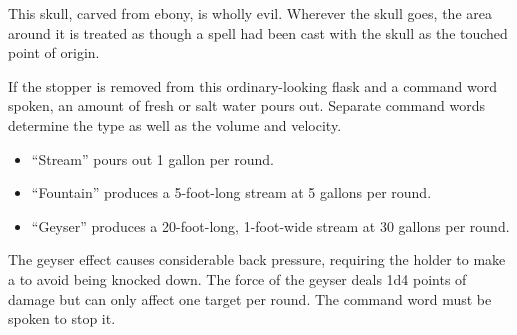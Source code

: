{

\begin{comment}
Cubic Gate:} This item is fashioned from carnelian. Each of the six sides of the cube is keyed to a plane, one of which is the Material Plane. The character creating the item should choose the planes to which the other five sides are keyed.

If a side of the cubic gate is pressed once, it opens a gate to a random point on the plane keyed to that side. There is a 10\% chance per minute that an outsider from that plane (determine randomly) comes through it looking for food, fun, or trouble. Pressing the side a second time closes the gate. It is impossible to open more than one gate at a time.

If a side is pressed twice in quick succession, the character so doing is transported to a random point on the other plane, along with all creatures in adjacent squares. (The other creatures may avoid this fate by succeeding on DR 23 Will saves).

Strong conjuration; CL 13th; Craft Wondrous Item, plane shift; Price 164,000 gp.
\end{comment}

 This skull, carved from ebony, is wholly evil. Wherever the skull goes, the area around it is treated as though a  spell had been cast with the skull as the touched point of origin.


 If the stopper is removed from this ordinary-looking flask and a command word spoken, an amount of fresh or salt water pours out. Separate command words determine the type as well as the volume and velocity.
\begin{itemize}
\item ``Stream'' pours out 1 gallon per round.
\item ``Fountain'' produces a 5-foot-long stream at 5 gallons per round.
\item ``Geyser'' produces a 20-foot-long, 1-foot-wide stream at 30 gallons per round.
\end{itemize}

The geyser effect causes considerable back pressure, requiring the holder to make a  to avoid being knocked down. The force of the geyser deals 1d4 points of damage but can only affect one target per round. The command word must be spoken to stop it.

}
